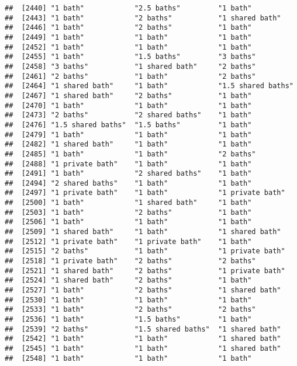 \documentclass[
]{article}
\begin{document}
\begin{verbatim}
##  [2440] "1 bath"            "2.5 baths"         "1 bath"           
##  [2443] "1 bath"            "2 baths"           "1 shared bath"    
##  [2446] "1 bath"            "2 baths"           "1 bath"           
##  [2449] "1 bath"            "1 bath"            "1 bath"           
##  [2452] "1 bath"            "1 bath"            "1 bath"           
##  [2455] "1 bath"            "1.5 baths"         "3 baths"          
##  [2458] "3 baths"           "1 shared bath"     "2 baths"          
##  [2461] "2 baths"           "1 bath"            "2 baths"          
##  [2464] "1 shared bath"     "1 bath"            "1.5 shared baths" 
##  [2467] "1 shared bath"     "2 baths"           "1 bath"           
##  [2470] "1 bath"            "1 bath"            "1 bath"           
##  [2473] "2 baths"           "2 shared baths"    "1 bath"           
##  [2476] "1.5 shared baths"  "1.5 baths"         "1 bath"           
##  [2479] "1 bath"            "1 bath"            "1 bath"           
##  [2482] "1 shared bath"     "1 bath"            "1 bath"           
##  [2485] "1 bath"            "1 bath"            "2 baths"          
##  [2488] "1 private bath"    "1 bath"            "1 bath"           
##  [2491] "1 bath"            "2 shared baths"    "1 bath"           
##  [2494] "2 shared baths"    "1 bath"            "1 bath"           
##  [2497] "1 private bath"    "1 bath"            "1 private bath"   
##  [2500] "1 bath"            "1 shared bath"     "1 bath"           
##  [2503] "1 bath"            "2 baths"           "1 bath"           
##  [2506] "1 bath"            "1 bath"            "1 bath"           
##  [2509] "1 shared bath"     "1 bath"            "1 shared bath"    
##  [2512] "1 private bath"    "1 private bath"    "1 bath"           
##  [2515] "2 baths"           "1 bath"            "1 private bath"   
##  [2518] "1 private bath"    "2 baths"           "2 baths"          
##  [2521] "1 shared bath"     "2 baths"           "1 private bath"   
##  [2524] "1 shared bath"     "2 baths"           "1 bath"           
##  [2527] "1 bath"            "2 baths"           "1 shared bath"    
##  [2530] "1 bath"            "1 bath"            "1 bath"           
##  [2533] "1 bath"            "2 baths"           "2 baths"          
##  [2536] "1 bath"            "1.5 baths"         "1 bath"           
##  [2539] "2 baths"           "1.5 shared baths"  "1 shared bath"    
##  [2542] "1 bath"            "1 bath"            "1 shared bath"    
##  [2545] "1 bath"            "1 bath"            "1 shared bath"    
##  [2548] "1 bath"            "1 bath"            "1 bath"           

\end{verbatim}
\end{document}
